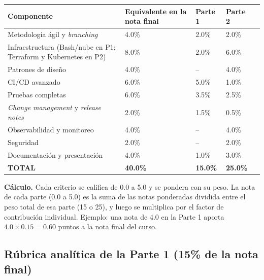 \documentclass[10pt,letterpaper]{article}
\begin{document}
\vspace{0.04cm}
\noindent\small
\begin{tabularx}{\textwidth}{|X|C{1.9cm}|C{2.3cm}|C{1.9cm}|C{1.9cm}|}
\hline
{}
\textbf{Componente} & \textbf{Equivalente en la nota final} & \textbf{Parte 1} & \textbf{Parte 2} \\ \hline
Metodología ágil y \textit{branching} & 4.0\% & 2.0\% & 2.0\% \\ \hline
Infraestructura (Bash/nube en P1; Terraform y Kubernetes en P2) & 8.0\% & 2.0\% & 6.0\% \\ \hline
Patrones de diseño & 4.0\% & -- & 4.0\% \\ \hline
CI/CD avanzado & 6.0\% & 5.0\% & 1.0\% \\ \hline
Pruebas completas & 6.0\% & 3.5\% & 2.5\% \\ \hline
\textit{Change management} y \textit{release notes} & 2.0\% & 1.5\% & 0.5\% \\ \hline
Observabilidad y monitoreo & 4.0\% & -- & 4.0\% \\ \hline
Seguridad & 2.0\% & -- & 2.0\% \\ \hline
Documentación y presentación & 4.0\% & 1.0\% & 3.0\% \\ \hline
{}
\textbf{TOTAL} & \textbf{40.0\%} & \textbf{15.0\%} & \textbf{25.0\%} \\ \hline
\end{tabularx}

\vspace{0.06cm}
\noindent\small\textbf{Cálculo.} Cada criterio se califica de 0.0 a 5.0 y se pondera con su peso. La nota de cada parte (0.0 a 5.0) es la suma de las notas ponderadas dividida entre el peso total de esa parte (15 o 25), y luego se multiplica por el factor de contribución individual. Ejemplo: una nota de 4.0 en la Parte 1 aporta $4.0 \times 0.15 = 0.60$ puntos a la nota final del curso.

\subsection{Rúbrica analítica de la Parte 1 (15\% de la nota final)}
\end{document}
